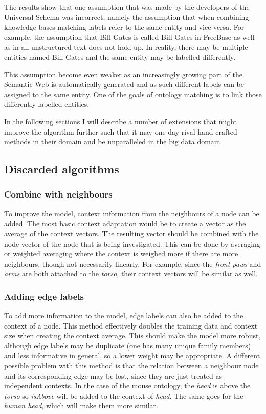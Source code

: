 \documentclass{article}
\begin{document}
  The results show that one assumption that was made by the developers of the Universal Schema was incorrect, namely the assumption that when combining knowledge bases matching labels refer to the same entity and vice versa. For example, the assumption that Bill Gates is called Bill Gates in FreeBase as well as in all unstructured text does not hold up. In reality, there may be multiple entities named Bill Gates and the same entity may be labelled differently. 
  
  This assumption become even weaker as an increasingly growing part of the Semantic Web is automatically generated and as such different labels can be assigned to the same entity. One of the goals of ontology matching is to link those differently labelled entities.
  
  In the following sections I will describe a number of extensions that might improve the algorithm further such that it may one day rival hand-crafted methods in their domain and be unparalleled in the big data domain.
 
 \subsection{Discarded algorithms}
  \subsubsection{Combine with neighbours}
  To improve the model, context information from the neighbours of a node can be added. The most basic context adaptation would be to create a vector as the average of the context vectors. The resulting vector should be combined with the node vector of the node that is being investigated. This can be done by averaging or weighted averaging where the context is weighed more if there are more neighbours, though not necessarily linearly.
  For example, since the \emph{front paws} and \emph{arms} are both attached to the \emph{torso}, their context vectors will be similar as well.
  
  \subsubsection{Adding edge labels}
  To add more information to the model, edge labels can also be added to the context of a node. This method effectively doubles the training data and context size when creating the context average. This should make the model more robust, although edge labels may be duplicate (one has many unique family members) and less informative in general, so a lower weight may be appropriate. A different possible problem with this method is that the relation between a neighbour node and its corresponding edge may be lost, since they are just treated as independent contexts.
  In the case of the mouse ontology, the \emph{head} is above the \emph{torso} so \emph{isAbove} will be added to the context of \emph{head}. The same goes for the \emph{human head}, which will make them more similar.
\end{document}
